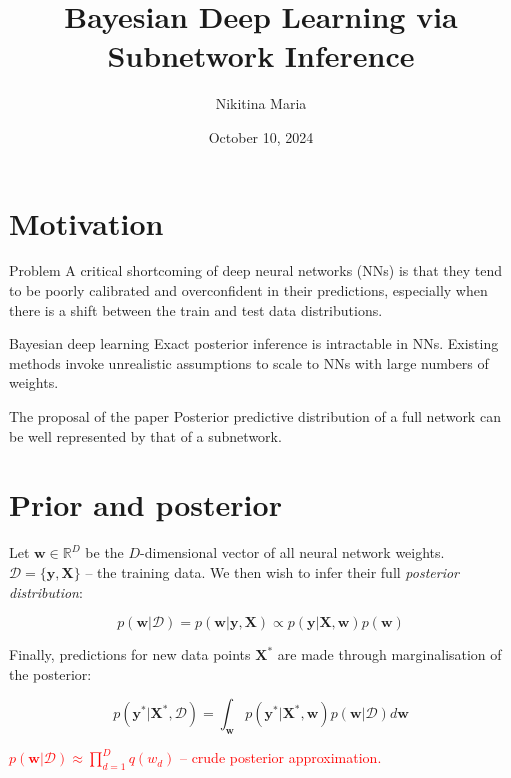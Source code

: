 \documentclass{beamer}
\begin{document}
\title{Bayesian Deep Learning via Subnetwork Inference}  
\author{Nikitina Maria}
\date{October 10, 2024} 
\frame{\titlepage} 
\begin{frame}
    \tableofcontents
\end{frame}
\section{Motivation}
\begin{frame}
\begin{block}{Problem}
A critical shortcoming of deep neural networks (NNs) is that they tend to be poorly calibrated and overconfident in their predictions, especially when there is a shift between the train and test data distributions.
\end{block}
\begin{block}{Bayesian deep learning}
Exact posterior inference is intractable in NNs. Existing methods invoke unrealistic assumptions to scale to NNs with large numbers of weights.
\end{block}
\begin{block}{The proposal of the paper}
Posterior predictive distribution of a full network can be well represented by that of a subnetwork.
\end{block}
\end{frame}
\section{Prior and posterior}
\begin{frame}
Let $\mathbf{w} \in \mathbb{R}^D$ be the $D$-dimensional vector of all neural network weights. $\mathcal{D} = \{\mathbf{y}, \mathbf{X}\}$ -- the training data. We then wish to infer their full \textit{posterior distribution}:

\[p(\mathbf{w} | \mathcal{D}) = p(\mathbf{w} | \mathbf{y}, \mathbf{X}) \propto p(\mathbf{y} | \mathbf{X}, \mathbf{w})p(\mathbf{w})\]

Finally, predictions for new data points $\mathbf{X}^*$ are made through marginalisation of the posterior:

\[p(\mathbf{y}^* | \mathbf{X}^*, \mathcal{D}) = \int_{\mathbf{w}} p(\mathbf{y}^* | \mathbf{X}^*, \mathbf{w}) p(\mathbf{w} | \mathcal{D}) d\mathbf{w}\]

\textcolor{red}{$p(\mathbf{w} | \mathcal{D}) \approx \prod_{d = 1}^D q(w_d)$ -- crude posterior approximation.}
\end{frame}
\end{document}
